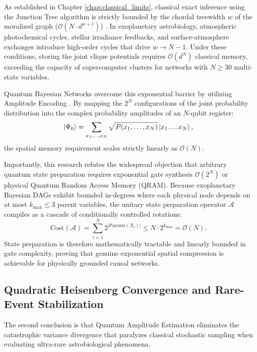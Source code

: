 As established in Chapter \ref{chap:classical_limits}, classical exact inference using the Junction Tree algorithm is strictly bounded by the chordal treewidth $w$ of the moralized graph ($\mathcal{O}(N \cdot d^{w+1})$) \cite{cooper1990, dagum1993}. In exoplanetary astrobiology, atmospheric photochemical cycles, stellar irradiance feedbacks, and surface-atmosphere exchanges introduce high-order cycles that drive $w \to N-1$. Under these conditions, storing the joint clique potentials requires $\mathcal{O}(d^N)$ classical memory, exceeding the capacity of supercomputer clusters for networks with $N \ge 30$ multi-state variables.

Quantum Bayesian Networks overcome this exponential barrier by utilizing Amplitude Encoding \cite{low2014}. By mapping the $2^N$ configurations of the joint probability distribution into the complex probability amplitudes of an $N$-qubit register:
\begin{equation}
\left|\Psi_0\right\rangle = \sum_{x_1, \dots, x_N} \sqrt{P(x_1, \dots, x_N)} \left|x_1 \dots x_N\right\rangle,
\end{equation}
the spatial memory requirement scales strictly linearly as $\mathcal{O}(N)$. 

Importantly, this research refutes the widespread objection that arbitrary quantum state preparation requires exponential gate synthesis $\mathcal{O}(2^N)$ or physical Quantum Random Access Memory (QRAM). Because exoplanetary Bayesian DAGs exhibit bounded in-degrees where each physical node depends on at most $k_{\max} \le 3$ parent variables, the unitary state preparation operator $\mathcal{A}$ compiles as a cascade of conditionally controlled rotations:
\begin{equation}
\mathrm{Cost}(\mathcal{A}) = \sum_{i=1}^N 2^{|\mathrm{Parents}(X_i)|} \le N \cdot 2^{k_{\max}} = \mathcal{O}(N).
\end{equation}
State preparation is therefore mathematically tractable and linearly bounded in gate complexity, proving that genuine exponential spatial compression is achievable for physically grounded causal networks.

\subsection{Quadratic Heisenberg Convergence and Rare-Event Stabilization}\label{subsec:conclusion_quadratic_speedup}

The second conclusion is that Quantum Amplitude Estimation eliminates the catastrophic variance divergence that paralyzes classical stochastic sampling when evaluating ultra-rare astrobiological phenomena.


